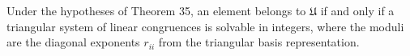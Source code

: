 Under the hypotheses of Theorem 35, an element belongs to $\mathfrak{U}$ if and only if a triangular system of linear congruences is solvable in integers, where the moduli are the diagonal exponents $r_{ii}$ from the triangular basis representation.

